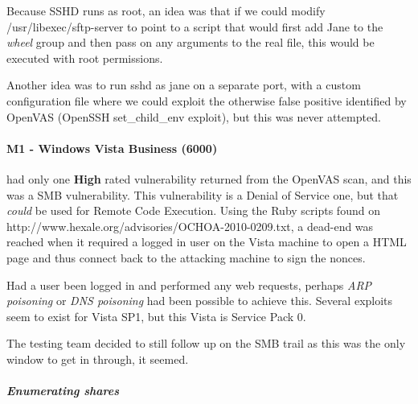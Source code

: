 Because SSHD runs as root, an idea was that if we could modify /usr/libexec/sftp-server to point to a script that would first add Jane to the \textit{wheel} group and then pass on any arguments to the real file, this would be executed with root permissions. 

Another idea was to run sshd as jane on a separate port, with a custom configuration file where we could exploit the otherwise false positive identified by OpenVAS (OpenSSH set\_child\_env exploit), but this was never attempted. 
 

\paragraph{M1 - Windows Vista Business (6000)}
had only one \textbf{High} rated vulnerability returned from the OpenVAS scan, and this was a SMB vulnerability. This vulnerability is a Denial of Service one, but that \textit{could} be used for Remote Code Execution. Using the Ruby scripts found on http://www.hexale.org/advisories/OCHOA-2010-0209.txt, a dead-end was reached when it required a logged in user on the Vista machine to open a HTML page and thus connect back to the attacking machine to sign the nonces.

Had a user been logged in and performed any web requests, perhaps \textit{ARP poisoning} or \textit{DNS poisoning} had been possible to achieve this. Several exploits seem to exist for Vista SP1, but this Vista is Service Pack 0.

The testing team decided to still follow up on the SMB trail as this was the only window to get in through, it seemed.

\subparagraph{Enumerating shares}


